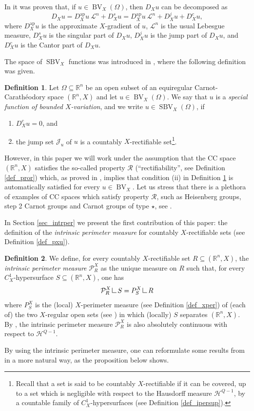 \documentclass[12pt,a4paper]{amsart}
\theoremstyle{definition}
\newtheorem{defi}{Definition}[section]
\theoremstyle{plain}
\newcommand{\R}{\mathbb{R}}
\newcommand{\se}{\subseteq}
\newcommand{\res} {\mathop{\hbox{\vrule height 7pt width .5pt depth 0pt \vrule height .5pt width 6pt depth 0pt}}\nolimits}
\newcommand{\leb}{\mathcal{L}}
\newcommand{\sbv}{\operatorname{SBV}}
\newcommand{\bv}{\operatorname{BV}}
\newcommand{\J}{\mathcal{J}}
\newcommand{\hau}{\mathcal{H}}
\newcommand{\ap}{{\operatorname{ap}}}
\begin{document}
In \cite{dv} it was proven that, if $u \in \bv_X(\Omega)$, then $D_Xu$ can be decomposed as
\[
D_Xu=D^{\ap}_Xu\: \leb^n+D^s_Xu=D^{\ap}_Xu\: \leb^n+D^j_Xu+D^c_Xu,
\]
where $D^\ap_Xu$ is the approximate $X$-gradient of $u$, $\leb^n$ is the usual Lebesgue measure, $D_X^su$ is the singular part of $D_Xu$, $D^j_Xu$ is the jump part of $D_Xu$, and $D_X^cu$ is the Cantor part of $D_Xu$. 


The space of $\sbv_X$ functions was introduced in \cite{sbvx}, where the following definition was given.


\begin{defi}\label{def_introsbvx}
 Let $\Omega\se\R^n$ be an open subset of an equiregular Carnot-Carathéodory space $(\R^n,X)$ and let $u \in \bv_X(\Omega)$. We say that $u$ is a \emph{special function of bounded $X$-variation}, and we write $u \in \sbv_X(\Omega)$, if
\begin{enumerate}
    \item[(i)] $D_X^c u=0$, and
    \item[(ii)] the jump set $\J_u$ of $u$ is a countably $X$-rectifiable set\footnote{Recall that a set is said to be countably $X$-rectifiable if it can be covered, up to a set which is negligible with respect to the Hausdorff measure $\hau^{Q-1}$, by a countable family of $C^1_X$-hypersurfaces (see Definition \ref{def_ipersup}).}.
\end{enumerate}
\end{defi}
However, in this paper we will work under the assumption that the CC space $(\R^n,X)$ satisfies the so-called property $\mathcal R$ (``rectifiability'', see Definition \ref{def_pror}) which, as proved in \cite[Theorem 1.5]{dv}, implies that condition (ii) in Definition \ref{def_introsbvx} is automatically satisfied for every $u \in \bv_X$. 
Let us stress that there is a plethora of examples of CC spaces which satisfy  property $\mathcal{R}$, such as Heisenberg groups, step 2 Carnot groups and Carnot groups of type $\star$, see \cite[Theorem 4.3]{dv}.



In Section \ref{sec_intrper} we present the first contribution of this paper: the definition of the \emph{intrinsic perimeter measure} for countably $X$-rectifiable sets (see Definition \ref{def_pxu}).
\begin{defi}
We define, for every countably $X$-rectifiable set $R \se (\R^n,X)$, the \emph{intrinsic perimeter measure} $\mathcal P^X_R$ as the unique measure on $R$ such that, for every $C^1_X$-hypersurface $S\se (\R^n,X)$, one has
\[
\mathcal P^X_R \res S =P^X_S \res R
\]
where $P^X_S$ is the (local) $X$-perimeter measure (see Definition \ref{def_xper}) of (each of) the two $X$-regular open sets (see \cite{vittone2012}) in which (locally) $S$ separates $(\R^n,X)$. By \cite{AmbrosioAhlfors}, the intrinsic perimeter measure $\mathcal P^X_R$ is also absolutely continuous with respect to $\hau^{Q-1}$.
\end{defi}
By using the intrinsic perimeter measure, one can reformulate some results from \cite{sbvx} in a more natural way, as the proposition below shows.
\end{document}
